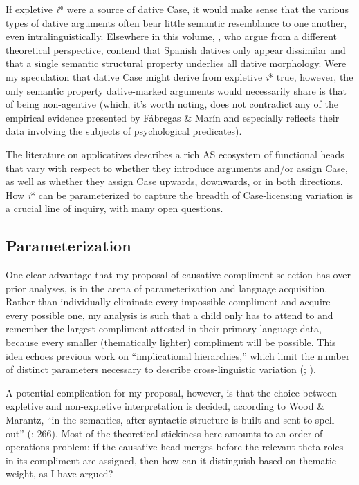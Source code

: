 \documentclass[output=paper,modfonts,nonflat,colorlinks,citecolor=brown]{langsci/langscibook}
\begin{document}
If expletive \textit{i}* were a source of dative Case, it would make sense that the various types of dative arguments often bear little semantic resemblance to one another, even intralinguistically. Elsewhere in this volume, , who argue from a different theoretical perspective, contend that Spanish datives only appear dissimilar and that a single semantic structural property underlies all dative morphology. Were my speculation that dative Case might derive from expletive \textit{i}* true, however, the only semantic property dative-marked arguments would necessarily share is that of being non-agentive (which, it’s worth noting, does not contradict any of the empirical evidence presented by Fábregas \& Marín and especially reflects their data involving the subjects of psychological predicates).



The literature on applicatives describes a rich AS ecosystem of functional heads that vary with respect to whether they introduce arguments and/or assign Case, as well as whether they assign Case upwards, downwards, or in both directions. How \textit{i}* can be parameterized to capture the breadth of Case-licensing variation is a crucial line of inquiry, with many open questions.

\subsection{Parameterization}\label{sec:wechsler:4.3}

One clear advantage that my proposal of causative compliment selection has over prior analyses, is in the arena of parameterization and language acquisition. Rather than individually eliminate every impossible compliment and acquire every possible one, my analysis is such that a child only has to attend to and remember the largest compliment attested in their primary language data, because every smaller (thematically lighter) compliment will be possible. This idea echoes previous work on “implicational hierarchies,” which limit the number of distinct parameters necessary to describe cross-linguistic variation (\citealt{HolmbergRoberts2009,Biberauer2011,BiberauerRoberts2012significance,BiberauerRoberts2015,Sheehan2013,BiberauerEtAl2013}; \citealt{WalBiberauer2014,BiberauerEtAl2014,vanderWal2017}).

A potential complication for my proposal, however, is that the choice between expletive and non-expletive interpretation is decided, according to Wood \& Marantz, “in the semantics, after syntactic structure is built and sent to spell-out” (\citeyear{WoodMarantz2017}: 266). Most of the theoretical stickiness here amounts to an order of operations problem: if the causative head merges before the relevant theta roles in its compliment are assigned, then how can it distinguish based on thematic weight, as I have argued?
\end{document}
